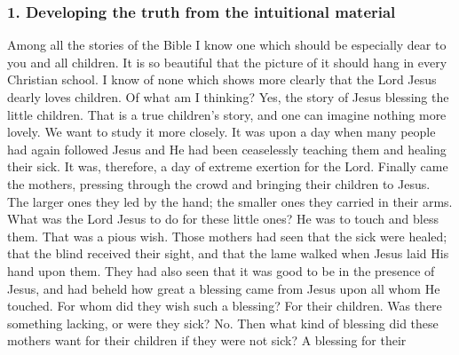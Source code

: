 \subsubsection{1. Developing the truth from the intuitional material} Among all the stories of the Bible I know one which should be especially dear to you and all children. It is so beautiful that the picture of it should hang in every Christian school. I know of none which shows more clearly that the Lord Jesus dearly loves children. Of what am I thinking? Yes, the story of Jesus blessing the little children. That is a true children’s story, and one can imagine nothing more lovely. We want to study it more closely. It was upon a day when many people had again followed Jesus and He had been ceaselessly teaching them and healing their sick. It was, therefore, a day of extreme exertion for the Lord. Finally came the mothers, pressing through the crowd and bringing their children to Jesus. The larger ones they led by the hand; the smaller ones they carried in their arms. What was the Lord Jesus to do for these little ones? He was to touch and bless them. That was a pious wish. Those mothers had seen that the sick were healed; that the blind received their sight, and that the lame walked when Jesus laid His hand upon them. They had also seen that it was good to be in the presence of Jesus, and had beheld how great a blessing came from Jesus upon all whom He touched. For whom did they wish such a blessing? For their children. Was there something lacking, or were they sick? No. Then what kind of blessing did these mothers want for their children if they were not sick? A blessing for their
